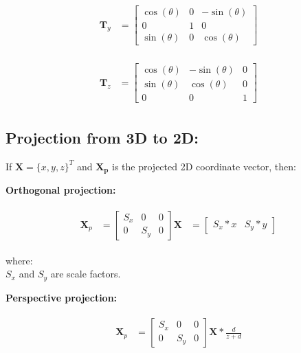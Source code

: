 \documentclass[10pt,b5paper,titlepage]{book}
\begin{document}
\begin{eqnarray}
    \begin{aligned}
        \mathbf{T}_y &=
        \begin{bmatrix}
            \cos(\theta) & 0 & -\sin(\theta) \\
            0 & 1 & 0 \\
            \sin(\theta) & 0 & \cos(\theta)
        \end{bmatrix}
    \end{aligned}
\end{eqnarray}

\begin{eqnarray}
    \begin{aligned}
        \mathbf{T}_z &=
        \begin{bmatrix}
            \cos(\theta) & -\sin(\theta) & 0 \\
            \sin(\theta) & \cos(\theta) & 0 \\
            0 & 0 & 1
        \end{bmatrix}
    \end{aligned}
\end{eqnarray}

\subsection{Projection from 3D to 2D:}

If $ \mathbf{X} = \{x, y, z\}^T $ and $ \mathbf{X_p} $ is the projected 2D coordinate vector, then:

\textbf{Orthogonal projection:}

\begin{eqnarray}
    \begin{aligned}
        \mathbf{X}_p &=
        \begin{bmatrix}
            S_x & 0 & 0 \\
            0 & S_y & 0
        \end{bmatrix}
        \mathbf{X}
        &=
        \begin{bmatrix}
            S_x * x & S_y * y
        \end{bmatrix}
    \end{aligned}
\end{eqnarray}

where: \\
$ S_x $ and $ S_y $ are scale factors.

\textbf{Perspective projection:}

\begin{eqnarray}
    \begin{aligned}
        \mathbf{X}_p &=
        \begin{bmatrix}
            S_x & 0 & 0 \\
            0 & S_y & 0
        \end{bmatrix}
        \mathbf{X} * \frac{d}{z + d}
    \end{aligned}
\end{eqnarray}
\end{document}
